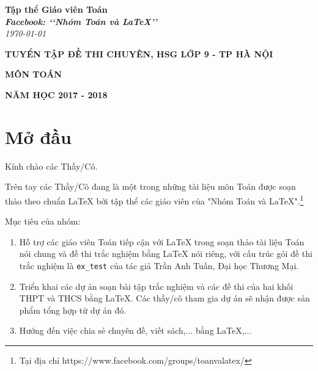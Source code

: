 \documentclass[12pt,a4paper,oneside]{book}
\renewcommand{\baselinestretch}{1.4}
\begin{document}
\providecommand*{\dx}{\ensuremath{\mathrm{\,d}}x}
\providecommand*{\unit}[1]{\ensuremath{\mathrm{\,#1}}}

\begin{titlepage}
\begin{flushright}
\fontsize{17}{0}\selectfont
\textbf{Tập thể Giáo viên Toán}\\
\textbf{\textit{Facebook: \lq\lq Nhóm Toán và LaTeX\rq\rq}}\\
\textit{\color{red}\today}
\end{flushright}

\vspace{4cm}

\begin{flushright}

\vspace{1cm}

 \textbf{\fontsize{20}{0}\selectfont T\fontsize{15}{0}\selectfont UYỂN TẬP ĐỀ THI CHUYÊN, HSG LỚP 9 - TP HÀ NỘI}
 
 \vspace{1cm}
 
 \textbf{\fontsize{35}{0}\selectfont MÔN TOÁN}
\end{flushright}

\vfill{
\begin{flushright}
\fontsize{17}{0}\textbf{NĂM HỌC 2017 - 2018}
\end{flushright}
}
\end{titlepage}
\pagestyle{empty}
\renewcommand{\headrulewidth}{0.4pt}

{\renewcommand{\baselinestretch}{1.3}
\tableofcontents
}

\pagestyle{fancy}
\lhead{\empty}
\rhead{\empty}
\lfoot{\currfilename}
\chapter*{Mở đầu}
Kính chào các Thầy/Cô.

\vspace{0.6cm}

\noindent Trên tay các Thầy/Cô đang là một trong những tài liệu môn Toán được soạn thảo theo chuẩn \LaTeX{} bởi tập thể các giáo viên của "Nhóm Toán và LaTeX".\footnote{Tại địa chỉ https://www.facebook.com/groups/toanvalatex/}

\vspace{0.6cm}

\noindent Mục tiêu của nhóm: 
\begin{enumerate}
\item Hỗ trợ các giáo viên Toán tiếp cận với \LaTeX{} trong soạn thảo tài liệu Toán nói chung và đề thi trắc nghiệm bằng \LaTeX{} nói riêng, với cấu trúc gói đề thi trắc nghiệm là \texttt{ex\_test} của tác giả Trần Anh Tuấn, Đại học Thương Mại.
\item Triển khai các dự án soạn bài tập trắc nghiệm và các đề thi của hai khối THPT và THCS bằng \LaTeX{}. Các thầy/cô tham gia dự án sẽ nhận được sản phẩm tổng hợp từ dự án đó.
\item Hướng đến việc chia sẻ chuyên đề, viết sách,... bằng \LaTeX,...
\end{enumerate}
\end{document}
